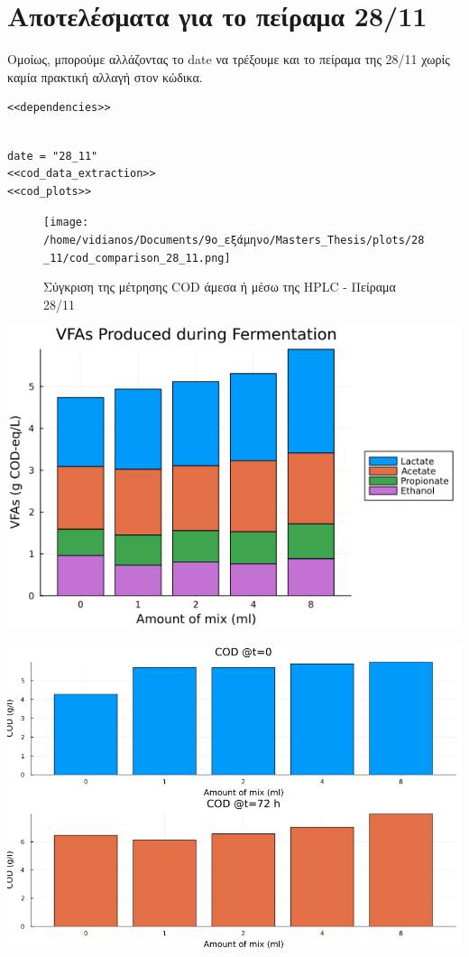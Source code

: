 \documentclass[11pt]{article}
\begin{document}
\section{Αποτελέσματα για το πείραμα 28/11}
\label{sec:org90cccc4}
Ομοίως, μπορούμε αλλάζοντας το date να τρέξουμε και το πείραμα της 28/11 χωρίς καμία πρακτική αλλαγή στον κώδικα.

\begin{verbatim}
<<dependencies>>
\end{verbatim}

\begin{verbatim}

date = "28_11"
<<cod_data_extraction>>
<<cod_plots>>

\end{verbatim}

\begin{figure}[htbp]
\centering
\texttt{[image: /home/vidianos/Documents/9o\_εξάμηνο/Masters\_Thesis/plots/28\_11/cod\_comparison\_28\_11.png]}
\caption{Σύγκριση της μέτρησης COD άμεσα ή μέσω της HPLC - Πείραμα 28/11}
\end{figure}

\begin{center}
\includegraphics[width=.9\linewidth]{../plots/28_11/vfa_cod_stackedbar_28_11.png}
\end{center}

\begin{center}
\includegraphics[width=.9\linewidth]{../plots/28_11/cod_bar_28_11.png}
\end{center}
\end{document}

